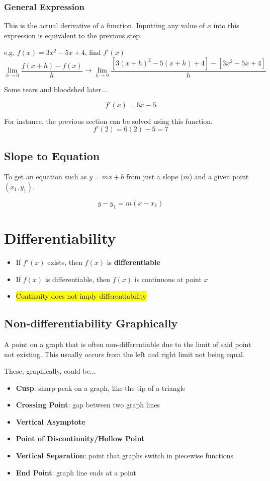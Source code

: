 \documentclass[a4paper,12pt]{article}
\begin{document}
\subsubsection{General Expression}
This is the actual derivative of a function. Inputting any value of $x$ into this expression is equivalent to the previous step.

e.g. $f(x) = 3x^2 - 5x + 4$, find $f'(x)$
$$\lim\limits_{h\to0}\frac{f(x+h)-f(x)}{h} \longrightarrow \lim\limits_{h\to0}\frac{[3(x+h)^2 - 5(x+h) + 4] - [3x^2 - 5x + 4]}{h}$$
\begin{center}Some tears and bloodshed later...\end{center}
$$f'(x) = 6x-5$$

For instance, the previous section can be solved using this function.
$$f'(2) = 6(2) - 5 = 7$$

\subsection{Slope to Equation}
To get an equation such as $y=mx+b$ from just a slope ($m$) and a given point $(x_1, y_1)$.

$$y - y_1 = m(x - x_1)$$

\section{Differentiability}
\begin{itemize}
    \item{If $f'(x)$ exists, then $f(x)$ is \textbf{differentiable}}
    \item{If $f(x)$ is differentiable, then $f(x)$ is continuous at point $x$}
    \item{\hl{Continuity does not imply differentiability}}
\end{itemize}

\subsection{Non-differentiability Graphically}
A point on a graph that is often non-differentiable due to the limit of said point not existing. This usually occurs from the left and right limit not being equal.

These, graphically, could be...
\begin{itemize}
    \item{\textbf{Cusp}: sharp peak on a graph, like the tip of a triangle}
    \item{\textbf{Crossing Point}: gap between two graph lines}
    \item{\textbf{Vertical Asymptote}}
    \item{\textbf{Point of Discontinuity/Hollow Point}}
    \item{\textbf{Vertical Separation}: point that graphs switch in piecewise functions}
    \item{\textbf{End Point}: graph line ends at a point}
\end{itemize}
\end{document}
